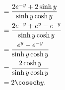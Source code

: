 \begin{enumerate}
\begin{align*}
               & = \frac{2e^{-y} + 2 \sinh y}{\sinh y \cosh y}                                                                                                \\
               & = \frac{2 e^{-y} + e^{y} - e^{-y}} {\sinh y \cosh y}                                                                                         \\
               & = \frac{e^y - e^{-y}}{\sinh y \cosh y}                                                                                                       \\
               & = \frac{2 \cosh y}{\sinh y \cosh y}                                                                                                          \\
               & = 2 \cosech y.
          \end{align*}
\end{enumerate}